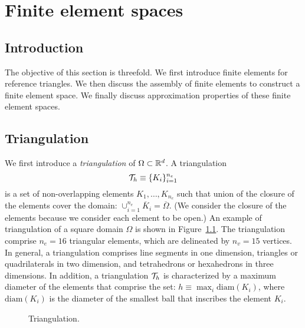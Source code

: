 \chapter{Finite element spaces}

\disclaimer

\section{Introduction}
The objective of this section is threefold.  We first introduce finite elements for reference triangles. We then discuss the assembly of finite elements to construct a finite element space.  We finally discuss approximation properties of these finite element spaces.

\section{Triangulation}
We first introduce a \emph{triangulation} of $\Omega \subset \mathbb{R}^d$.  A triangulation
\begin{equation*}
  \mathcal{T}_h \equiv \{ K_i \}_{i=1}^{n_e}
\end{equation*}
is a set of non-overlapping elements $K_1, \dots, K_{n_e}$ such that union of the closure of the elements cover the domain: $\cup_{i=1}^{n_e} \overline K_i = \overline \Omega$.   (We consider the closure of the elements because we consider each element to be open.) An example of triangulation of a square domain $\Omega$ is shown in Figure~\ref{fig:fe_mesh_p1}.  The triangulation comprise $n_e = 16$ triangular elements, which are delineated by $n_v = 15$ vertices.  In general, a triangulation comprises line segments in one dimension, triangles or quadrilaterals in two dimension, and tetrahedrons or hexahedrons in three dimensions.  In addition, a triangulation $\mathcal{T}_h$ is characterized by a maximum diameter of the elements that comprise the set: $h \equiv \max_{i} \text{diam}(K_i)$, where $\text{diam}(K_i)$ is the diameter of the smallest ball that inscribes the element $K_i$.


\begin{figure}
  \centering
  \caption{Triangulation.}
  \label{fig:fe_mesh_p1}
\end{figure}


